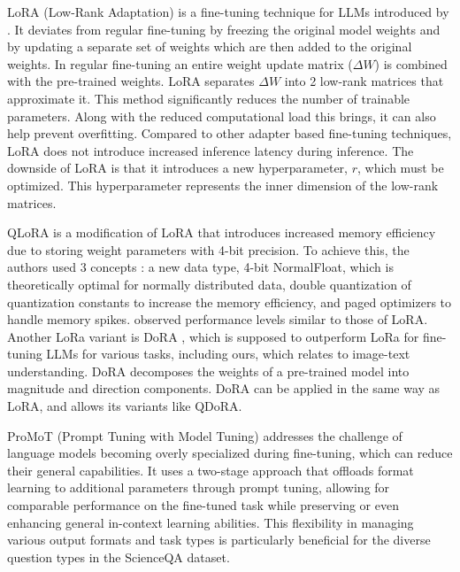 \documentclass{article}
\begin{document}
LoRA (Low-Rank Adaptation) is a fine-tuning technique for LLMs introduced by \cite{lora}. It deviates from regular fine-tuning by freezing the original model weights and by updating a separate set of weights which are then added to the original weights. In regular fine-tuning an entire weight update matrix ($\Delta W$) is combined with the pre-trained weights. LoRA separates $\Delta W$ into 2 low-rank matrices that approximate it. This method significantly reduces the number of trainable parameters. Along with the reduced computational load this brings, it can also help prevent overfitting. Compared to other adapter based fine-tuning techniques, LoRA does not introduce increased inference latency during inference. The downside of LoRA is that it introduces a new hyperparameter, $r$, which must be optimized. This hyperparameter represents the inner dimension of the low-rank matrices.\par

QLoRA \cite{qlora} is a modification of LoRA that introduces increased memory efficiency due to storing weight parameters with 4-bit precision. To achieve this, the authors used 3 concepts : a new data type, 4-bit NormalFloat, which is theoretically optimal for normally distributed data, double quantization of quantization constants to increase the memory efficiency, and paged optimizers to handle memory spikes. \cite{qlora} observed performance levels similar to those of LoRA. Another LoRa variant is DoRA \cite{dora}, which is supposed to outperform LoRa for fine-tuning LLMs for various tasks, including ours, which relates to image-text understanding. DoRA decomposes the weights of a pre-trained model into magnitude and direction components. DoRA can be applied in the same way as LoRA, and allows its variants like QDoRA.\par

ProMoT (Prompt Tuning with Model Tuning) \cite{valizadehaslani2022twostagefinetuningnovelstrategy} addresses the challenge of language models becoming overly specialized during fine-tuning, which can reduce their general capabilities. It uses a two-stage approach that offloads format learning to additional parameters through prompt tuning, allowing for comparable performance on the fine-tuned task while preserving or even enhancing general in-context learning abilities. This flexibility in managing various output formats and task types is particularly beneficial for the diverse question types in the ScienceQA dataset.\par
\end{document}
